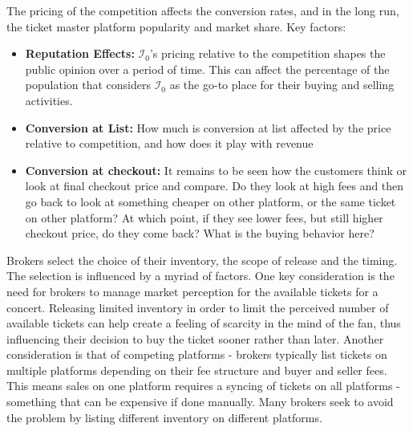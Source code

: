 \documentclass[letterpaper, 12pt]{article}
\begin{document}
 The pricing of the competition affects the conversion rates, and in the long run, the ticket master platform popularity and market share. Key factors:
\begin{itemize}\itemsep0em
\item {\bf Reputation Effects:} $\mathcal{I}_0$'s pricing relative to the competition shapes the public opinion over a period of time. This can affect the percentage of the population that considers $\mathcal{I}_0$ as the go-to place for their buying and selling activities.
\item {\bf Conversion at List:} How much is conversion at list affected by the price relative to competition, and how does it play with revenue
\item {\bf Conversion at checkout:} It remains to be seen how the customers think or look at final checkout price and compare. Do they look at high fees and then go back to look at something cheaper on other platform, or the same ticket on other platform? At which point, if they see lower fees, but still higher checkout price, do they come back? What is the buying behavior here?
\end{itemize}

 Brokers select the choice of their inventory, the scope of release and the timing. The selection is influenced by a myriad of factors. One key consideration is the need for brokers to manage market perception for the available tickets for a concert. Releasing limited inventory in order to limit the perceived number of available tickets can help create a feeling of scarcity in the mind of the fan, thus influencing their decision to buy the ticket sooner rather than later. Another consideration is that of competing platforms - brokers typically list tickets on multiple platforms depending on their fee structure and buyer and seller fees. This means sales on one platform requires a syncing of tickets on all platforms - something that can be expensive if done manually. Many brokers seek to avoid the problem by listing different inventory on different platforms.
\end{document}
